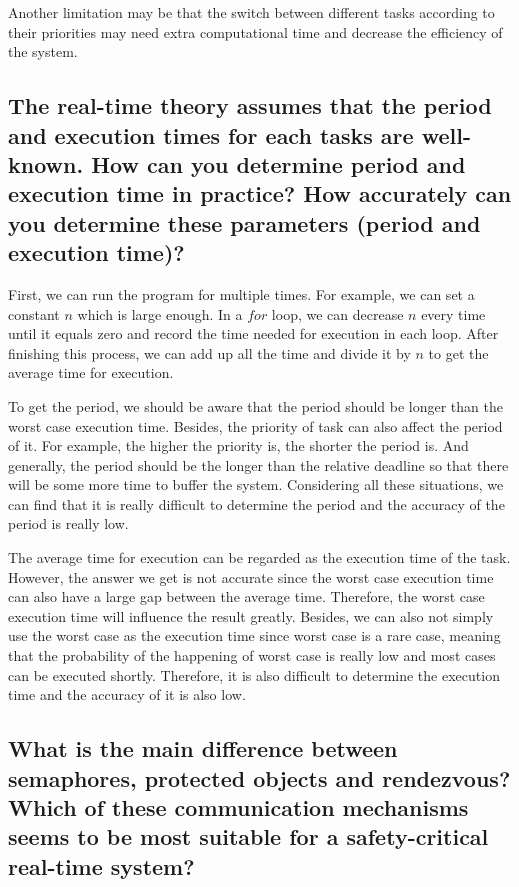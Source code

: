 \documentclass[10pt]{article}
\begin{document}
Another limitation may be that the switch between different tasks according to their priorities may need extra computational time and decrease the efficiency of the system.

\subsection{The real-time theory assumes that the period and execution times for each tasks are well-known. How can you determine period and execution time in practice? How accurately can you determine these parameters (period and execution time)?}

First, we can run the program for multiple times. For example, we can set a constant $n$ which is large enough. In a $for$ loop, we can decrease $n$ every time until it equals zero and record the time needed for execution in each loop. After finishing this process, we can add up all the time and divide it by $n$ to get the average time for execution.

To get the period, we should be aware that the period should be longer than the worst case execution time. Besides, the priority of task can also affect the period of it. For example, the higher the priority is, the shorter the period is. And generally, the period should be the longer than the relative deadline so that there will be some more time to buffer the system. Considering all these situations, we can find that it is really difficult to determine the period and the accuracy of the period is really low.

The average time for execution can be regarded as the execution time of the task. However, the answer we get is not accurate since the worst case execution time can also have a large gap between the average time. Therefore, the worst case execution time will influence the result greatly. Besides, we can also not simply use the worst case as the execution time since worst case is a rare case, meaning that the probability of the happening of worst case is really low and most cases can be executed shortly. Therefore, it is also difficult to determine the execution time and the accuracy of it is also low.

\subsection{What is the main difference between semaphores, protected objects and rendezvous? Which of these communication mechanisms seems to be most suitable for a safety-critical real-time system?}
\end{document}
